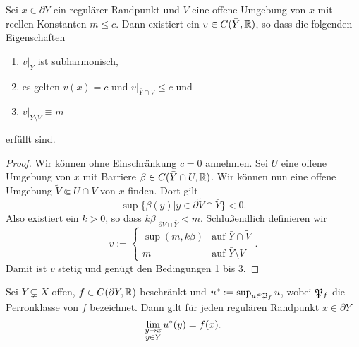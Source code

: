 \begin{lemma}
  \label{lemma:regulär-trennen}
  Sei $x \in \partial Y$ ein regulärer Randpunkt und $V$ eine offene
  Umgebung von $x$ mit reellen Konstanten $m \leq c$. Dann existiert
  ein $v \in C( \bar Y, \mathbb{R})$, so dass die folgenden Eigenschaften
  \begin{enumerate}
  \item $v|_Y$ ist subharmonisch,
  \item es gelten $v(x) = c$ und $v|_{\bar Y \cap V} \leq c$ und
  \item $v|_{\bar Y\setminus V} \equiv m$
  \end{enumerate}
  erfüllt sind.
\end{lemma}

\begin{proof}
  Wir können ohne Einschränkung $c = 0$ annehmen. Sei $U$ eine offene Umgebung von $x$ mit Barriere $\beta \in C(\bar
  Y \cap U, \mathbb{R})$. Wir können nun eine offene Umgebung $\tilde V \Subset U \cap V$
  von $x$ finden. Dort gilt
  \[
  \sup\{\beta(y)| y \in \partial \tilde V \cap \bar Y \} < 0.
  \]
  Also existiert ein $k > 0$, so dass $k\beta|_{\partial \tilde V \cap
    \bar Y} < m$.
  Schlußendlich definieren wir
  \[
  v :=
  \begin{cases}
    \sup(m, k\beta) & \text{auf } \bar Y \cap \tilde V\\
    m & \text{auf } \bar Y \setminus V
  \end{cases}.
  \]
  Damit ist $v$ stetig und genügt den Bedingungen 1 bis 3.
\end{proof}

\begin{lemma}
  Sei $Y \subsetneq X$ offen, $f \in C(\partial Y, \mathbb{R})$ beschränkt und
  $u^\ast := \sup_{u \in \mathfrak{P}_f}u$, wobei $\mathfrak{P}_f$ die Perronklasse von
  $f$ bezeichnet. Dann gilt für jeden regulären Randpunkt $x \in \partial Y$
  \[
  \lim_{\substack{y \rightarrow x\\y \in Y}} u^\ast(y) = f(x).
  \]
\end{lemma}

